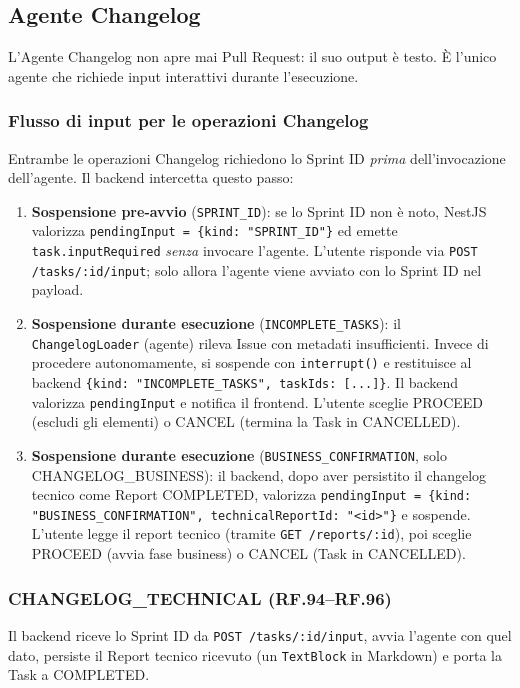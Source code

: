 \documentclass[11pt,a4paper]{article}
\begin{document}
\subsection{Agente Changelog}
\label{sec:be-agente-changelog}

L'Agente Changelog non apre mai Pull Request: il suo output è testo. È l'unico agente che richiede input interattivi durante l'esecuzione.

\subsubsection{Flusso di input per le operazioni Changelog}

Entrambe le operazioni Changelog richiedono lo Sprint ID \emph{prima} dell'invocazione dell'agente. Il backend intercetta questo passo:
\begin{enumerate}
    \item \textbf{Sospensione pre-avvio} (\texttt{SPRINT\_ID}): se lo Sprint ID non è noto, NestJS valorizza \texttt{pendingInput = \{kind: "SPRINT\_ID"\}} ed emette \texttt{task.inputRequired} \emph{senza} invocare l'agente. L'utente risponde via \texttt{POST /tasks/:id/input}; solo allora l'agente viene avviato con lo Sprint ID nel payload.
    \item \textbf{Sospensione durante esecuzione} (\texttt{INCOMPLETE\_TASKS}): il \texttt{ChangelogLoader} (agente) rileva Issue con metadati insufficienti. Invece di procedere autonomamente, si sospende con \texttt{interrupt()} e restituisce al backend \texttt{\{kind: "INCOMPLETE\_TASKS", taskIds: [...]\}}. Il backend valorizza \texttt{pendingInput} e notifica il frontend. L'utente sceglie PROCEED (escludi gli elementi) o CANCEL (termina la Task in CANCELLED).
    \item \textbf{Sospensione durante esecuzione} (\texttt{BUSINESS\_CONFIRMATION}, solo CHANGELOG\_BUSINESS): il backend, dopo aver persistito il changelog tecnico come Report COMPLETED, valorizza \texttt{pendingInput = \{kind: "BUSINESS\_CONFIRMATION", technicalReportId: "<id>"\}} e sospende. L'utente legge il report tecnico (tramite \texttt{GET /reports/:id}), poi sceglie PROCEED (avvia fase business) o CANCEL (Task in CANCELLED).
\end{enumerate}

\subsubsection{CHANGELOG\_TECHNICAL (RF.94--RF.96)}
Il backend riceve lo Sprint ID da \texttt{POST /tasks/:id/input}, avvia l'agente con quel dato, persiste il Report tecnico ricevuto (un \texttt{TextBlock} in Markdown) e porta la Task a COMPLETED.
\end{document}
